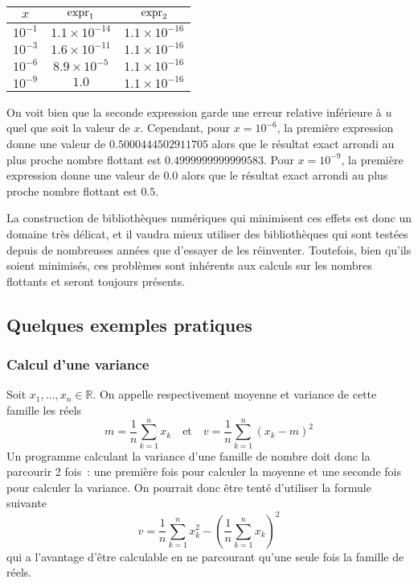 \documentclass{article}
\newcommand{\R}{\mathbb{R}}
\newcommand{\p}[1]{\left(#1\right)}
\begin{document}
\begin{itemize}
\begin{center}
\begin{tabular}{|c|c|c|}
			\hline
			$x$ & ${\rm expr}_1$ & ${\rm expr}_2$\\
			\hline
			$10^{-1}$ & $1.1\times 10^{-14}$ & $1.1\times 10^{-16}$ \\
			\hline
			$10^{-3}$ & $1.6\times 10^{-11}$ & $1.1\times 10^{-16}$ \\
			\hline
			$10^{-6}$ & $8.9\times 10^{-5}$ & $1.1\times 10^{-16}$ \\
			\hline
			$10^{-9}$ & $1.0$ & $1.1\times 10^{-16}$ \\
			\hline
		\end{tabular}
		\end{center}
		On voit bien que la seconde expression garde une erreur relative inférieure
		à $u$ quel que soit la valeur de $x$. Cependant, pour $x=10^{-6}$, la
		première expression donne une valeur de $0.5000444502911705$ alors que
		le résultat exact arrondi au plus proche nombre flottant est
		$0.4999999999999583$. Pour $x=10^{-9}$, la première expression donne une
		valeur de $0.0$ alors que le résultat exact arrondi au plus proche nombre
		flottant est $0.5$.
\end{itemize}

La construction de bibliothèques numériques qui minimisent ces effets est
donc un domaine très délicat, et il vaudra mieux utiliser des bibliothèques
qui sont testées depuis de nombreuses années que d'essayer de les réinventer.
Toutefois, bien qu'ils soient minimisés, ces problèmes sont inhérents aux
calculs sur les nombres flottants et seront toujours présents.

\subsection{Quelques exemples pratiques}

\subsubsection{Calcul d'une variance}
Soit $x_1,\ldots,x_n\in\R$. On appelle respectivement moyenne et variance
de cette famille les réels
\[m = \frac{1}{n}\sum_{k=1}^n x_k \quad\text{et}\quad
  v = \frac{1}{n}\sum_{k=1}^n (x_k - m)^2\]
Un programme calculant la variance d'une famille de nombre doit donc la
parcourir 2 fois~: une première fois pour calculer la moyenne et une seconde
fois pour calculer la variance. On pourrait donc être tenté d'utiliser la
formule suivante
\[v = \frac{1}{n}\sum_{k=1}^n x_k^2 - \p{\frac{1}{n} \sum_{k=1}^n x_k}^2\]
qui a l'avantage d'être calculable en ne parcourant qu'une seule fois la
famille de réels.\\
\end{document}
